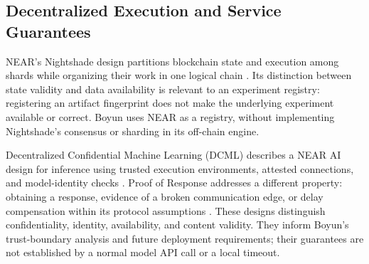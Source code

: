 \subsection{Decentralized Execution and Service Guarantees}
NEAR's Nightshade design partitions blockchain state and execution among
shards while organizing their work in one logical chain \cite{nightshade2024}.
Its distinction between state validity and data availability is relevant to
an experiment registry: registering an artifact fingerprint does not make
the underlying experiment available or correct. Boyun uses NEAR as a registry,
without implementing Nightshade's consensus or sharding in its off-chain engine.

Decentralized Confidential Machine Learning (DCML) describes a NEAR AI design
for inference using trusted execution environments, attested connections,
and model-identity checks \cite{dcml}. Proof of Response addresses a different
property: obtaining a response, evidence of a broken communication edge, or
delay compensation within its protocol assumptions \cite{proofresponse2025}.
These designs distinguish confidentiality, identity, availability, and content
validity. They inform Boyun's trust-boundary analysis and future deployment
requirements; their guarantees are not established by a normal model API call
or a local timeout.
